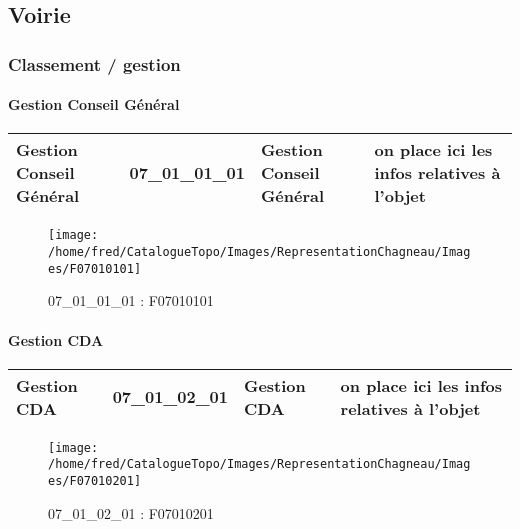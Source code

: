 \documentclass[12pt,titlepage,oneside]{book}
\begin{document}
\subsection{Voirie}
\subsubsection{\large Classement / gestion}
\paragraph{Gestion Conseil Général}
\noindent
\vspace{\baselineskip}

\renewcommand{\arraystretch}{1.2}
\begin{supertabular}{|p{10cm}|c|p{13cm}|p{12cm}|}
 Gestion Conseil Général & 07\_01\_01\_01 & Gestion Conseil Général & on place ici les infos relatives à l'objet\\
\hline
\end{supertabular}
\begin{figure}[h!]
  \hfill         %
  \begin{minipage}[t]{3cm}
    \begin{center}
      \texttt{[image: /home/fred/CatalogueTopo/Images/RepresentationChagneau/Images/F07010101]}
      \caption[F07010101]{\label{} 07\_01\_01\_01 : F07010101}
    \end{center}
  \end{minipage}
\end{figure}


\paragraph{Gestion CDA}
\noindent
\vspace{\baselineskip}

\renewcommand{\arraystretch}{1.2}
\begin{supertabular}{|p{10cm}|c|p{13cm}|p{12cm}|}
 Gestion CDA & 07\_01\_02\_01 & Gestion CDA & on place ici les infos relatives à l'objet\\
\hline
\end{supertabular}
\begin{figure}[h!]
  \hfill         %
  \begin{minipage}[t]{3cm}
    \begin{center}
      \texttt{[image: /home/fred/CatalogueTopo/Images/RepresentationChagneau/Images/F07010201]}
      \caption[F07010201]{\label{} 07\_01\_02\_01 : F07010201}
    \end{center}
  \end{minipage}
\end{figure}
\end{document}
